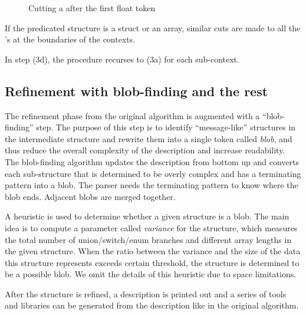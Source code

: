 \begin{figure}[th]
\begin{center}
\end{center}
\caption{Cutting a \seqset{} after the first float token} \label{fig:cut}
\end{figure}

If the predicated structure is a struct or an array, similar cuts are
made to all the \seqset's at the boundaries of the contexts.

In step (3d), the procedure recurses to (3a) for each sub-context.

\subsection{Refinement with blob-finding and the rest}
The refinement phase from the original algorithm is augmented with
a ``blob-finding'' step. The purpose of this step is to identify
``message-like'' structures in the intermediate structure and rewrite them into
a single token called {\em blob}, and thus reduce the overall complexity
of the description and increase readability. The blob-finding algorithm
updates the description from bottom up and converts each sub-structure that is
determined to be overly complex and has a terminating pattern into a
blob. The \pads{} parser needs the terminating pattern to
know where the blob ends. Adjacent blobs are merged together. 

A heuristic is used to determine whether a given structure is
a blob. The main idea is to compute a parameter called {\em variance}
for the structure, which measures the total number of union/switch/enum
branches and different array lengths in the given 
structure. When the ratio between the variance and the size of the data
this structure represents exceeds certain threshold, the structure is
determined to be a possible blob. We omit the details of this
heuristic due to space limitations.

After the structure is refined, a \pads{} description is printed out
and a series of tools and libraries can be generated from the description
like in the original algorithm.

